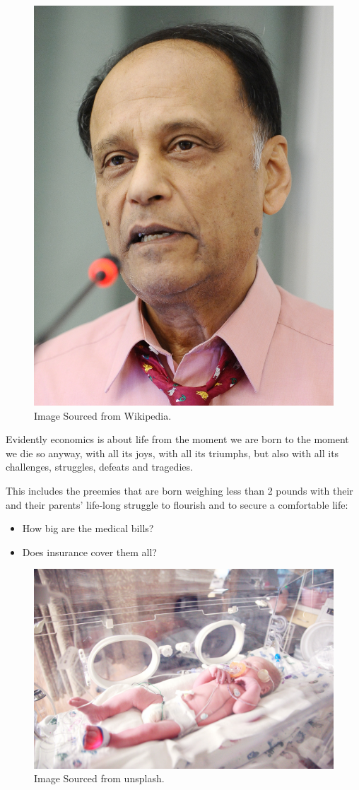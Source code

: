 \documentclass[
]{book}
\providecommand{\tightlist}{%
  \setlength{\itemsep}{0pt}\setlength{\parskip}{0pt}}
\begin{document}
\begin{figure}

{\centering \includegraphics[width=0.5\linewidth]{img/intro/Partha_Dasgupta} 

}

\caption{Image Sourced from Wikipedia.}\label{fig:intro03}
\end{figure}

Evidently economics is about life from the moment we are born to the moment we die so anyway, with all its joys, with all its triumphs, but also with all its challenges, struggles, defeats and tragedies.

This includes the preemies that are born weighing less than 2 pounds with their and their parents' life-long struggle to flourish and to secure a comfortable life:

\begin{itemize}
\tightlist
\item
  How big are the medical bills?
\item
  Does insurance cover them all?
\end{itemize}

\begin{figure}

{\centering \includegraphics[width=0.5\linewidth]{img/intro/fig4} 

}

\caption{Image Sourced from unsplash.}\label{fig:intro04}
\end{figure}
\end{document}

